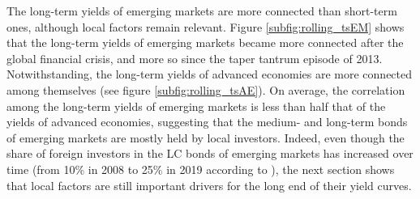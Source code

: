 {The long-term yields of emerging markets are more connected than short-term ones, although local factors remain relevant.
Figure \ref{subfig:rolling_tsEM} shows that the long-term yields of emerging markets became more connected after the global financial crisis, and more so since the taper tantrum episode of 2013. 
Notwithstanding, the long-term yields of advanced economies are more connected among themselves (see figure \ref{subfig:rolling_tsAE}). On average, the correlation among the long-term yields of emerging markets is less than half that of the yields of advanced economies, suggesting that the medium- and long-term bonds of emerging markets are mostly held by local investors. Indeed, even though the share of foreign investors in the LC bonds of emerging markets has increased over time (from 10\% in 2008 to 25\% in 2019 according to \cite{KolasaWesolowski:2020}), the next section shows that local factors %
are still important drivers for the long end of their yield curves.

}
